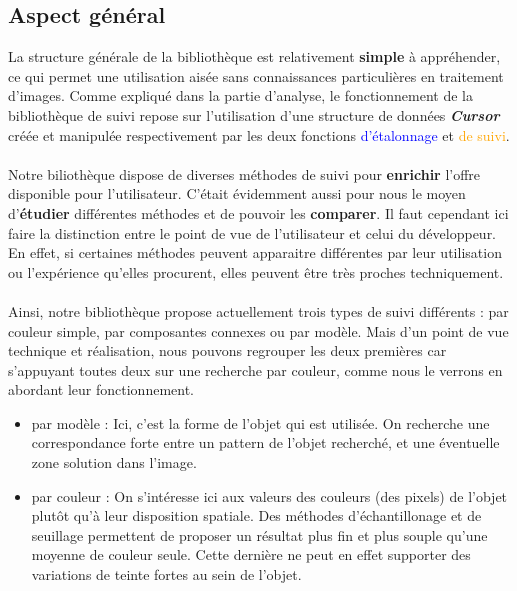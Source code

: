 \documentclass{report}
\begin{document}
				\subsection{Aspect général}
				La structure générale de la bibliothèque est relativement \textbf{simple} à appréhender, ce qui permet une utilisation aisée sans connaissances particulières en traitement d'images. Comme expliqué dans la partie d'analyse, le fonctionnement de la bibliothèque de suivi repose sur l'utilisation d'une structure de données \textbf{\textit{Cursor}} créée et manipulée respectivement par les deux fonctions \textcolor{blue}{d'étalonnage} et \textcolor{orange}{de suivi}.
				\paragraph{} Notre biliothèque dispose de diverses méthodes de suivi pour \textbf{enrichir} l'offre disponible pour l'utilisateur. C'était évidemment aussi pour nous le moyen d'\textbf{étudier} différentes méthodes et de pouvoir les \textbf{comparer}. Il faut cependant ici faire la distinction entre le point de vue de l'utilisateur et celui du développeur. En effet, si certaines méthodes peuvent apparaitre différentes par leur utilisation ou l'expérience qu'elles procurent, elles peuvent être très proches techniquement.
				\paragraph{}Ainsi, notre bibliothèque propose actuellement trois types de suivi différents : par couleur simple, par composantes connexes ou par modèle. Mais d'un point de vue technique et réalisation, nous pouvons regrouper les deux premières car s'appuyant toutes deux sur une recherche par couleur, comme nous le verrons en abordant leur fonctionnement.\\
				\begin{itemize}
\item {\textcolor{marron}{par modèle} : } Ici, c'est la forme de l'objet qui est utilisée. On recherche une correspondance forte entre un pattern de l'objet recherché, et une éventuelle zone solution dans l'image. \\
\item {\textcolor{vert}{par couleur} : } On s'intéresse ici aux valeurs des couleurs (des pixels) de l'objet plutôt qu'à leur disposition spatiale. Des méthodes d'échantillonage et de seuillage permettent de proposer un résultat plus fin et plus souple qu'une moyenne de couleur seule. Cette dernière ne peut en effet supporter des variations de teinte fortes au sein de l'objet.
				\end{itemize}
							
\end{document}
